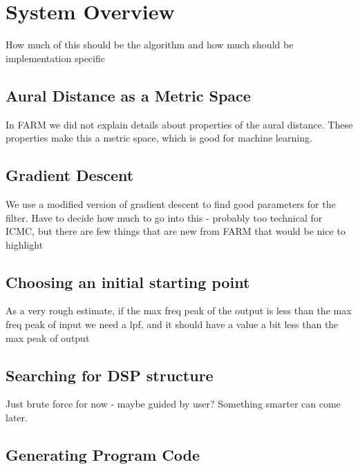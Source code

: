 \section{System Overview}

How much of this should be the algorithm and how much should be implementation specific


\subsection{Aural Distance as a Metric Space}

In FARM we did not explain details about properties of the aural distance.
These properties make this a metric space, which is good for machine learning.

\subsection{Gradient Descent}

We use a modified version of gradient descent to find good parameters for the filter.
Have to decide how much to go into this - probably too technical for ICMC, but there are few things that are new from FARM that would be nice to highlight

\subsection{Choosing an initial starting point}

As a very rough estimate, if the max freq peak of the output is less than the max freq peak of input
  we need a lpf, and it should have a value a bit less than the max peak of output

\subsection{Searching for DSP structure}

Just brute force for now - maybe guided by user? 
Something smarter can come later.

\subsection{Generating Program Code}


